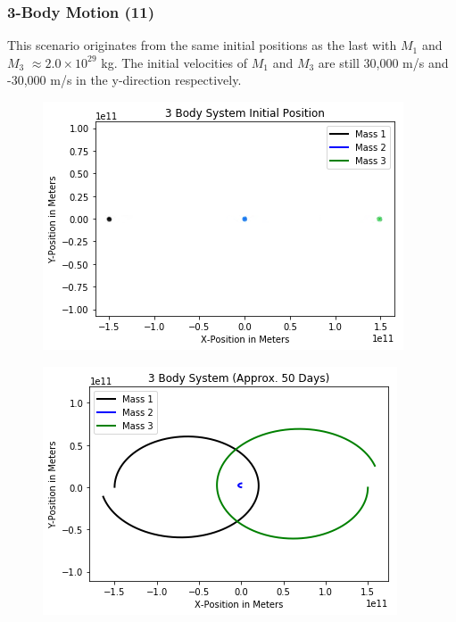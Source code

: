 \documentclass{beamer}
\begin{document}
\begin{frame}
\frametitle{3-Body Motion (11)}
This scenario originates from the same initial positions as the last with $M_1$ and $M_3$ $\approx 2.0 \times 10^{29}$ kg. The initial velocities of $M_1$ and $M_3$ are still 30,000 m/s and -30,000 m/s in the y-direction respectively.
\begin{multicols}{2}
\begin{figure}
\begin{center}
\includegraphics[width=1.0\linewidth]{3BodyDynamics6.png}
\end{center}
\end{figure}
\begin{figure}
\begin{center}
\includegraphics[width=1.0\linewidth]{3BodyDynamics9.png}
\end{center}
\end{figure}
\end{multicols}
\end{frame}
\end{document}
